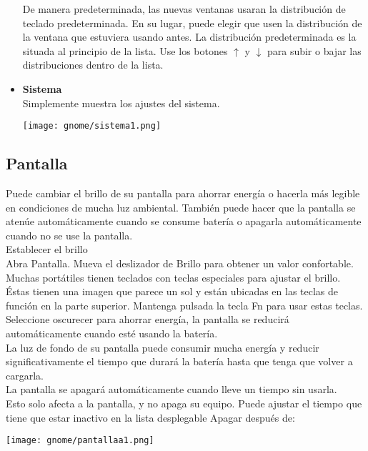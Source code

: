 \begin{itemize}
De manera predeterminada, las nuevas ventanas usaran la distribución de teclado predeterminada. En su lugar, puede elegir que usen la distribución de la ventana que estuviera usando antes. La distribución predeterminada es la situada al principio de la lista. Use los botones $\uparrow$ y $\downarrow$ para subir o bajar las distribuciones dentro de la lista.
	\item {\large \bf Sistema}\\
	Simplemente muestra los ajustes del sistema.	
	\begin{center}
		\texttt{[image: gnome/sistema1.png]} 
    \end{center}
\end{itemize}
\subsection{Pantalla}
Puede cambiar el brillo de su pantalla para ahorrar energía o hacerla más legible en condiciones de mucha luz ambiental. También puede hacer que la pantalla se atenúe automáticamente cuando se consume batería o apagarla automáticamente cuando no se use la pantalla.\\

Establecer el brillo\\

Abra Pantalla.
Mueva el deslizador de Brillo para obtener un valor confortable.\\

Muchas portátiles tienen teclados con teclas especiales para ajustar el brillo. Éstas tienen una imagen que parece un sol y están ubicadas en las teclas de función en la parte superior. Mantenga pulsada la tecla Fn para usar estas teclas.\\

Seleccione oscurecer para ahorrar energía, la pantalla se reducirá  automáticamente cuando esté usando la batería.\\
La luz de fondo de su pantalla puede consumir mucha energía y reducir significativamente el tiempo que durará la batería hasta que tenga que volver a cargarla.\\
La pantalla se apagará automáticamente cuando lleve un tiempo sin usarla.\\
Esto solo afecta a la pantalla, y no apaga su equipo. Puede ajustar el tiempo que tiene que estar inactivo en la lista desplegable Apagar después de:
\begin{center}
\texttt{[image: gnome/pantallaa1.png]} 
\end{center}
